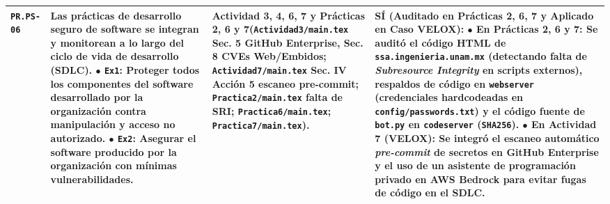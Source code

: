 \documentclass[letterpaper,11pt]{article}
\begin{document}
\begin{longtable}{|C{1.5cm}|L{5.3cm}|L{4.3cm}|L{5.8cm}|}
\texttt{PR.PS-06} &
\textbf{Las prácticas de desarrollo seguro de software se integran y monitorean a lo largo del ciclo de vida de desarrollo (SDLC).}\newline
$\bullet$ \texttt{Ex1}: Proteger todos los componentes del software desarrollado por la organización contra manipulación y acceso no autorizado.\newline
$\bullet$ \texttt{Ex2}: Asegurar el software producido por la organización con mínimas vulnerabilidades. &
\textbf{Actividad 3, 4, 6, 7 y Prácticas 2, 6 y 7}\newline (\texttt{Actividad3/main.tex} Sec. 5 GitHub Enterprise, Sec. 8 CVEs Web/Embidos; \texttt{Actividad7/main.tex} Sec. IV Acción 5 escaneo pre-commit; \texttt{Practica2/main.tex} falta de SRI; \texttt{Practica6/main.tex}; \texttt{Practica7/main.tex}). &
\textbf{SÍ (Auditado en Prácticas 2, 6, 7 y Aplicado en Caso VELOX):}\newline
$\bullet$ \textbf{En Prácticas 2, 6 y 7:} Se auditó el código HTML de \texttt{ssa.ingenieria.unam.mx} (detectando falta de \textit{Subresource Integrity} en scripts externos), respaldos de código en \texttt{webserver} (credenciales hardcodeadas en \texttt{config/passwords.txt}) y el código fuente de \texttt{bot.py} en \texttt{codeserver} (\texttt{SHA256}).\newline
$\bullet$ \textbf{En Actividad 7 (VELOX):} Se integró el escaneo automático \textit{pre-commit} de secretos en \textbf{GitHub Enterprise} y el uso de un asistente de programación privado en AWS Bedrock para evitar fugas de código en el SDLC. \\
\hline


\end{longtable}
\end{document}
